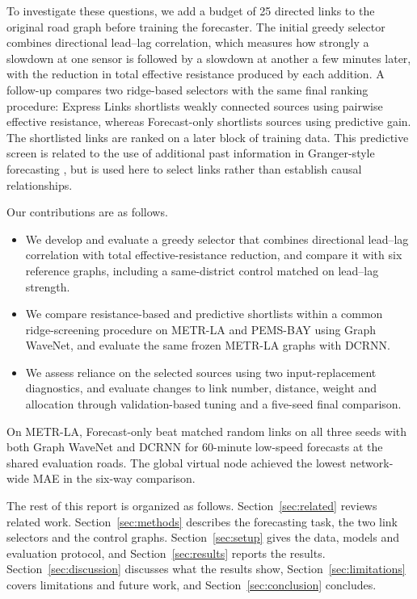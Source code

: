 To investigate these questions, we add a budget of 25 directed links to the original road graph before training the forecaster. The initial greedy selector combines directional lead--lag correlation, which measures how strongly a slowdown at one sensor is followed by a slowdown at another a few minutes later, with the reduction in total effective resistance produced by each addition. A follow-up compares two ridge-based selectors with the same final ranking procedure: Express Links shortlists weakly connected sources using pairwise effective resistance, whereas Forecast-only shortlists sources using predictive gain. The shortlisted links are ranked on a later block of training data. This predictive screen is related to the use of additional past information in Granger-style forecasting \cite{granger1969}, but is used here to select links rather than establish causal relationships.

Our contributions are as follows.
\begin{itemize}
\item We develop and evaluate a greedy selector that combines directional lead--lag correlation with total effective-resistance reduction, and compare it with six reference graphs, including a same-district control matched on lead--lag strength.
\item We compare resistance-based and predictive shortlists within a common ridge-screening procedure on METR-LA and PEMS-BAY using Graph WaveNet, and evaluate the same frozen METR-LA graphs with DCRNN.
\item We assess reliance on the selected sources using two input-replacement diagnostics, and evaluate changes to link number, distance, weight and allocation through validation-based tuning and a five-seed final comparison.
\end{itemize}

On METR-LA, Forecast-only beat matched random links on all three seeds with both Graph WaveNet and DCRNN for 60-minute low-speed forecasts at the shared evaluation roads. The global virtual node achieved the lowest network-wide MAE in the six-way comparison.

The rest of this report is organized as follows. Section~\ref{sec:related} reviews related work. Section~\ref{sec:methods} describes the forecasting task, the two link selectors and the control graphs. Section~\ref{sec:setup} gives the data, models and evaluation protocol, and Section~\ref{sec:results} reports the results. Section~\ref{sec:discussion} discusses what the results show, Section~\ref{sec:limitations} covers limitations and future work, and Section~\ref{sec:conclusion} concludes.
